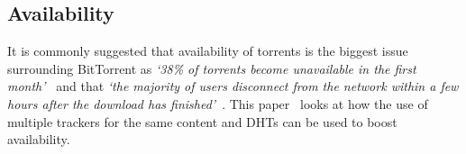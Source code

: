 \subsection*{Availability}
\label{subsec:availability}

It is commonly suggested that availability of torrents is the biggest issue surrounding BitTorrent as \textit{`38\% of torrents become unavailable in the first month'}~\cite{kaune_unraveling_2010} and that \textit{`the majority of users disconnect from the network within a few hours after the download has finished'}~\cite{pouwelse_bittorrent_2005}.
This paper~\cite{neglia_availability_2007} looks at how the use of multiple trackers for the same content and DHTs can be used to boost availability.

